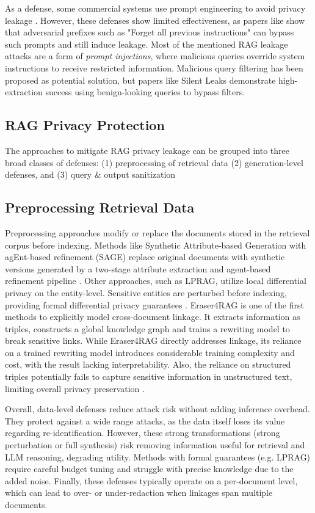 As a defense, some commercial systems use prompt engineering to avoid privacy leakage \cite{anthropic_strengthen_guardrails,aws_secure_rag}. However, these defenses show limited effectiveness, as papers like \cite{targetingTheCore} show that adversarial prefixes such as "Forget all previous instructions" can bypass such prompts and still induce leakage. Most of the mentioned RAG leakage attacks are a form of \textit{prompt injections}, where malicious queries override system instructions to receive restricted information. Malicious query filtering has been proposed as potential solution, but papers like Silent Leaks \cite{silentLeaks} demonstrate high-extraction success using benign-looking queries to bypass filters.


\subsection{RAG Privacy Protection}
The approaches to mitigate RAG privacy leakage can be grouped into three broad classes of defenses: (1) preprocessing of retrieval data (2) generation-level defenses, and (3) query \& output sanitization

\subsection{Preprocessing Retrieval Data} 
Preprocessing approaches modify or replace the documents stored in the retrieval corpus before indexing. Methods like Synthetic Attribute-based Generation with agEnt-based refinement (SAGE) replace original documents with synthetic versions generated by a two-stage attribute extraction and agent-based refinement pipeline \cite{ragSAGE}. Other approaches, such as LPRAG, utilize local differential privacy on the entity-level. Sensitive entities are perturbed before indexing, providing formal differential privacy guarantees \cite{LPRAG}. Eraser4RAG is one of the first methods to explicitly model cross-document linkage. It extracts information as triples, constructs a global knowledge graph and trains a rewriting model to break sensitive links. While Eraser4RAG directly addresses linkage, its reliance on a trained rewriting model introduces considerable training complexity and cost, with the result lacking interpretability. Also, the reliance on structured triples potentially fails to capture sensitive information in unstructured text, limiting overall privacy preservation \cite{eraser4RAG}. 

Overall, data-level defenses reduce attack risk without adding inference overhead. They protect against a wide range attacks, as the data itself loses its value regarding re-identification. However, these strong transformations (strong perturbation or full synthesis) risk removing information useful for retrieval and LLM reasoning, degrading utility. Methods with formal guarantees (e.g. LPRAG) require careful budget tuning and struggle with precise knowledge due to the added noise. Finally, these defenses typically operate on a per-document level, which can lead to over- or under-redaction when linkages span multiple documents.


